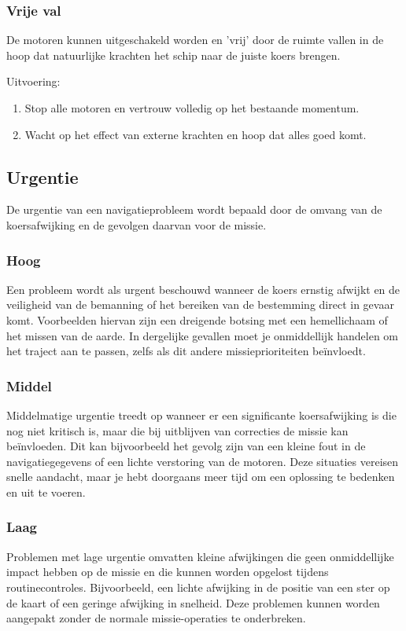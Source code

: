 \subsubsection{Vrije val}
De motoren kunnen uitgeschakeld worden en 'vrij' door de ruimte vallen in de hoop dat natuurlijke krachten het schip naar de juiste koers brengen.

Uitvoering:
\begin{enumerate}
    \item Stop alle motoren en vertrouw volledig op het bestaande momentum.
    \item Wacht op het effect van externe krachten en hoop dat alles goed komt.
\end{enumerate}


\subsection{Urgentie}
De urgentie van een navigatieprobleem wordt bepaald door de omvang van de koersafwijking en de gevolgen daarvan voor de missie.

\subsubsection{Hoog}
Een probleem wordt als urgent beschouwd wanneer de koers ernstig afwijkt en de veiligheid van de bemanning of het bereiken van de bestemming direct in gevaar komt. Voorbeelden hiervan zijn een dreigende botsing met een hemellichaam of het missen van de aarde. In dergelijke gevallen moet je onmiddellijk handelen om het traject aan te passen, zelfs als dit andere missieprioriteiten beïnvloedt.

\subsubsection{Middel}
Middelmatige urgentie treedt op wanneer er een significante koersafwijking is die nog niet kritisch is, maar die bij uitblijven van correcties de missie kan beïnvloeden. Dit kan bijvoorbeeld het gevolg zijn van een kleine fout in de navigatiegegevens of een lichte verstoring van de motoren. Deze situaties vereisen snelle aandacht, maar je hebt doorgaans meer tijd om een oplossing te bedenken en uit te voeren.

\subsubsection{Laag}
Problemen met lage urgentie omvatten kleine afwijkingen die geen onmiddellijke impact hebben op de missie en die kunnen worden opgelost tijdens routinecontroles. Bijvoorbeeld, een lichte afwijking in de positie van een ster op de kaart of een geringe afwijking in snelheid. Deze problemen kunnen worden aangepakt zonder de normale missie-operaties te onderbreken.
